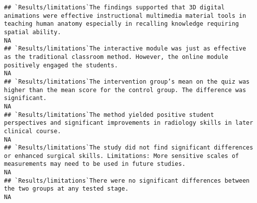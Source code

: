 \documentclass[]{article}
\begin{document}
\begin{verbatim}
## `Results/limitations`The findings supported that 3D digital animations were effective instructional multimedia material tools in teaching human anatomy especially in recalling knowledge requiring spatial ability.                                                                                                                                                                                                                                                                    NA
## `Results/limitations`The interactive module was just as effective as the traditional classroom method. However, the online module positively engaged the students.                                                                                                                                                                                                                                                                                                                      NA
## `Results/limitations`The intervention group’s mean on the quiz was higher than the mean score for the control group. The difference was significant.                                                                                                                                                                                                                                                                                                                                    NA
## `Results/limitations`The method yielded positive student perspectives and significant improvements in radiology skills in later clinical course.                                                                                                                                                                                                                                                                                                                                        NA
## `Results/limitations`The study did not find significant differences or enhanced surgical skills. Limitations: More sensitive scales of measurements may need to be used in future studies.                                                                                                                                                                                                                                                                                              NA
## `Results/limitations`There were no significant differences between the two groups at any tested stage.                                                                                                                                                                                                                                                                                                                                                                                  NA

\end{verbatim}
\end{document}
